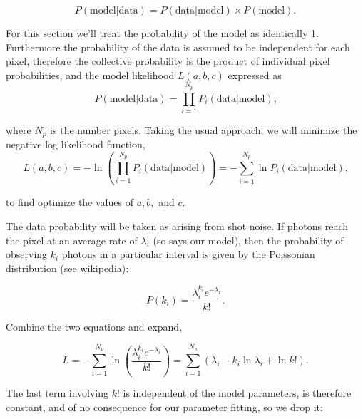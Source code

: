 \documentclass[12pt, letterpaper]{article}
\begin{document}
    \begin{equation}
    P(\textrm{model|data}) = P(\textrm{data|model}) \times P(\textrm{model})
    \text{.}
    \label{eqn:Bayes}
  \end{equation}

  For this section we'll treat the probability of the model as identically 1.  Furthermore the probability 
  of the data is assumed to be independent for each pixel, therefore the collective probability is the
  product of individual pixel probabilities, and the model likelihood $L(a,b,c)$ expressed as 
      \begin{equation}
    P(\textrm{model|data}) = \prod_{i=1}^{N_p} {P_i(\textrm{data|model}) }
    \text{,}
    \label{eqn:Bayes2}
  \end{equation}
  
  where $N_p$ is the number pixels. Taking the usual approach, we will minimize the negative 
  log likelihood function,
      \begin{equation}
    L(a,b,c) = -\ln (\prod_{i=1}^{N_p} {P_i(\textrm{data|model}) }) =
    -\sum_{i=1}^{N_p} \ln {P_i(\textrm{data|model}) }
    \text{,}
    \label{eqn:Bayes2}
  \end{equation}
 
   to find optimize the values of $a, b,$ and $c$.
   \par The data probability will be taken as arising from shot noise.  If photons reach the pixel at
   an average rate of $\lambda_i$ (so says our model), then the probability of observing $k_i$ 
   photons in a particular interval is given by the Poissonian distribution (see wikipedia):
   
    \begin{equation}
   P(k_i) = \frac{\lambda_i^{k_i} e^{-\lambda_i}}{k!}
    \text{.}
    \label{eqn:Poisson}
  \end{equation}

\par Combine the two equations and expand,
   
    \begin{equation}
   L =  -\sum_{i=1}^{N_p} \ln ( \frac{\lambda_i^{k_i} e^{-\lambda_i}}{k!} )
  = \sum_{i=1}^{N_p} ( \lambda_i - k_i \ln \lambda_i + \ln k! )
    \text{.}
    \label{eqn:terms}
  \end{equation}
\par The last term involving $k!$ is independent of the model parameters, is therefore constant, 
and of no consequence for our parameter fitting, so we drop it:
\end{document}
